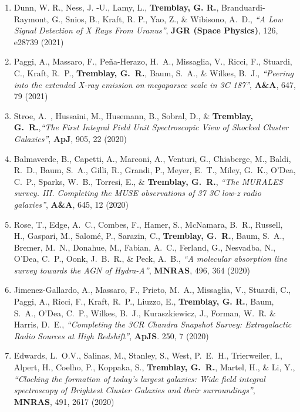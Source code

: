 \documentclass[11pt]{article}
\begin{document}
\begin{enumerate}[resume]
\item Dunn, W. R., Ness, J. -U., Lamy, L., \textbf{Tremblay, G. R.}, Branduardi-Raymont, G., Snios, B., Kraft, R. P., Yao, Z., \& Wibisono, A.~D., \textit{``A Low Signal Detection of X Rays From Uranus''}, \textbf{JGR (Space Physics)}, 126, e28739 (2021)


\item Paggi, A., Massaro, F., Pe\~{n}a-Herazo, H.~A., Missaglia, V., Ricci, F., Stuardi, C., Kraft, R.~P., \textbf{Tremblay, G.~R.}, Baum, S.~A., \& Wilkes, B.~J., \textit{``Peering into the extended X-ray emission on megaparsec scale in 3C 187''}, \textbf{A\&A}, 647, 79 (2021)


\item Stroe, A.~, Hussaini, M., Husemann, B., Sobral, D., \& \textbf{Tremblay, G.~R.},\textit{``The First Integral Field Unit Spectroscopic View of Shocked Cluster Galaxies''}, \textbf{ApJ}, 905, 22 (2020)

\item Balmaverde, B., Capetti, A., Marconi, A., Venturi, G., Chiaberge, M.,
Baldi, R.~D., Baum, S.~A., Gilli, R., Grandi, P., Meyer, E.~T., Miley, G.~K.,
O'Dea, C.~P., Sparks, W.~B., Torresi, E., \& \textbf{Tremblay, G.~R.},
\textit{``The MURALES survey. III. Completing the MUSE observations of 37 3C low-z radio galaxies''},
\textbf{A\&A}, 645, 12 (2020)


\item Rose, T., Edge, A.~C., Combes, F., Hamer, S., McNamara, B.~R.,
Russell, H., Gaspari, M., Salom\'{e}, P., Sarazin, C., \textbf{Tremblay, G.~R.},
Baum, S.~A., Bremer, M.~N., Donahue, M., Fabian, A.~C., Ferland, G.,
Nesvadba, N., O'Dea, C.~P., Oonk, J.~B.~R., \& Peck, A.~B.,
\textit{``A molecular absorption line survey towards the AGN of Hydra-A''},
\textbf{MNRAS}, 496, 364 (2020)


\item Jimenez-Gallardo, A., Massaro, F., Prieto, M.~A.,
Missaglia, V., Stuardi, C., Paggi, A., Ricci, F., Kraft, R.~P.,
Liuzzo, E., \textbf{Tremblay, G. R.},
Baum, S.~A., O'Dea, C.~P., Wilkes, B.~J.,
Kuraszkiewicz, J., Forman, W.~R. \& Harris, D.~E., \textit{``Completing the 3CR Chandra Snapshot Survey: Extragalactic Radio Sources at High Redshift''},
\textbf{ApJS}. 250, 7 (2020)



\item Edwards, L.~O.V., Salinas, M., Stanley, S., West, P.~E.~H.,
  Trierweiler, I., Alpert, H., Coelho, P., Koppaka, S., \textbf{Tremblay, G.~R.},
  Martel, H., \& Li, Y., \textit{``Clocking the formation of today's largest galaxies: Wide field integral spectroscopy of Brightest Cluster Galaxies and their surroundings''},
  \textbf{MNRAS}, 491, 2617 (2020)



\end{enumerate}
\end{document}
